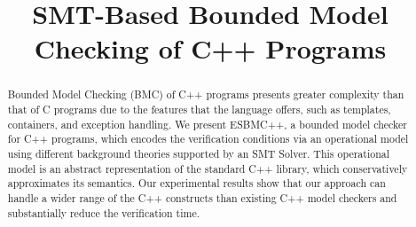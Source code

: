 \documentclass[a4paper]{llncs}
\newcommand{\comment}[1]{}
\begin{document}
\lstset{language=C,basicstyle=\small}
\lstset{numbers=left, numberstyle=\tiny, stepnumber=1, numbersep=5pt}
\lstset{tabsize=2}
\lstset{firstnumber=1}
\lstset{frame=single}


\title{SMT-Based Bounded Model Checking of C++ Programs}
\comment{
\author{Lucas Cordeiro$^1$ \and
	Jeremy Morse$^2$   \and
	Denis Nicole$^2$   \and
	Bernd Fischer$^2$}
\authorrunning{Lucas Cordeiro, Jeremy Morse, Denis Nicole, Bernd Fischer}
\institute{
  $^1$ Electronic and Information Research Center, %
  Federal University of Amazonas, Brazil\\
  $^2$ Electronics and Computer Science, %
  University of Southampton, UK\\
  \url{esbmc@ecs.soton.ac.uk}
}
}

\maketitle

\begin{abstract}
Bounded Model Checking (BMC) of C++ programs presents greater
complexity than that of C programs due to the features that the language offers, such as
templates, containers, and exception handling. We present ESBMC++, a bounded
model checker for C++ programs, which encodes the verification conditions via
an operational model using different background theories supported 
by an SMT Solver. This operational model is an abstract representation of
the standard C++ library, which conservatively approximates its semantics. Our
experimental results show that our approach can handle a wider range of the C++
constructs than existing C++ model checkers and substantially reduce the verification time.
\end{abstract}

\end{document}
